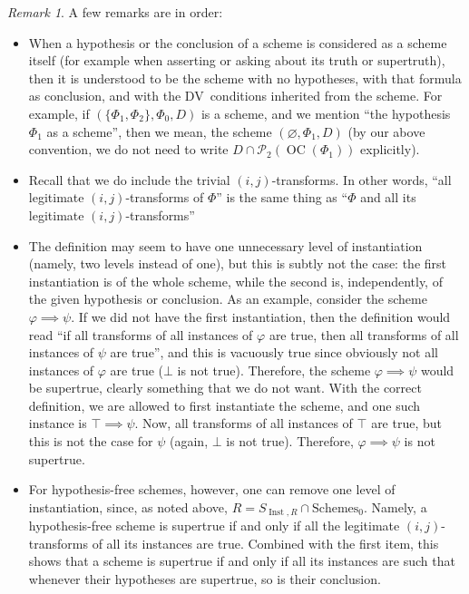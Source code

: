 \documentclass[11pt]{article}
\newcommand*{\rimplies}{\implies}
\renewcommand*{\phi}{\varphi}
\DeclareMathOperator{\OC}{OC}
\newcommand*{\Schemes}{\mathrm{Schemes}}
\newcommand*{\Schemeshypfree}{{\Schemes_0}}
\DeclareMathOperator{\Inst}{Inst}
\theoremstyle{plain}
\theoremstyle{definition}
\theoremstyle{remark}
\newtheorem{remark}[theorem]{Remark}
\begin{document}
\begin{remark}
A few remarks are in order:
\begin{itemize}
\item
When a hypothesis or the conclusion of a scheme is considered as a scheme itself (for example when asserting or asking about its truth or supertruth), then it is understood to be the scheme with no hypotheses, with that formula as conclusion, and with the DV~conditions inherited from the scheme.
For example, if $(\{\Phi_1, \Phi_2\}, \Phi_0, D)$ is a scheme, and we mention ``the hypothesis $\Phi_1$ as a scheme'', then we mean, the scheme $(\varnothing, \Phi_1, D)$ (by our above convention, we do not need to write $D \cap \mathcal{P}_2(\OC(\Phi_1))$ explicitly).

\item
Recall that we do include the trivial $(i, j)$-transforms.
In other words, ``all legitimate $(i, j)$-transforms of $\Phi$'' is the same thing as ``$\Phi$ and all its legitimate $(i, j)$-transforms''

\item
The definition may seem to have one unnecessary level of instantiation (namely, two levels instead of one), but this is subtly not the case: the first instantiation is of the whole scheme, while the second is, independently, of the given hypothesis or conclusion.
As an example, consider the scheme $\phi \rimplies \psi$.
If we did not have the first instantiation, then the definition would read ``if all transforms of all instances of $\phi$ are true, then all transforms of all instances of $\psi$ are true'', and this is vacuously true since obviously not all instances of $\phi$ are true ($\bot$ is not true).
Therefore, the scheme $\phi \rimplies \psi$ would be supertrue, clearly something that we do not want.
With the correct definition, we are allowed to first instantiate the scheme, and one such instance is $\top \rimplies \psi$.
Now, all transforms of all instances of $\top$ are true, but this is not the case for $\psi$ (again, $\bot$ is not true).
Therefore, $\phi \rimplies \psi$ is not supertrue.

\item
For hypothesis-free schemes, however, one can remove one level of instantiation, since, as noted above,
$R = S_{\Inst, R} \cap \Schemeshypfree$.
Namely, a hypothesis-free scheme is supertrue if and only if all the legitimate $(i, j)$-transforms of all its instances are true.
Combined with the first item, this shows that a scheme is supertrue if and only if all its instances are such that whenever their hypotheses are supertrue, so is their conclusion.


\end{itemize}
\end{remark}
\end{document}
